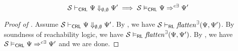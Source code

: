 \begin{theorem}\label{thm:proofsystemSoundness}
\begin{equation*}
    \mathcal{S} \vdash_{\mathsf{CRL}} \Psi \Downarrow_{\emptyset,\emptyset} \Psi^\prime \implies
    \mathcal{S} \vDash_{\mathsf{CRL}} \Psi \Rightarrow^{c\exists} \Psi^\prime
\end{equation*}
\end{theorem}
\begin{proof}[Proof of ]
Assume $\mathcal{S} \vdash_{\mathsf{CRL}} \Psi \Downarrow_{\emptyset,\emptyset} \Psi^\prime$.
By , we have $\mathcal{S} \vdash_{\mathsf{RL}} \mathit{flatten}^\exists(\Psi, \Psi^\prime)$.
By soundness of reachability logic, we have $\mathcal{S} \vDash_{\mathsf{RL}} \mathit{flatten}^\exists(\Psi, \Psi^\prime)$.
By , 
we have $\mathcal{S} \vDash_{\mathsf{CRL}} \Psi \Rightarrow^{c\exists} \Psi^\prime$ and we are done.
\end{proof}